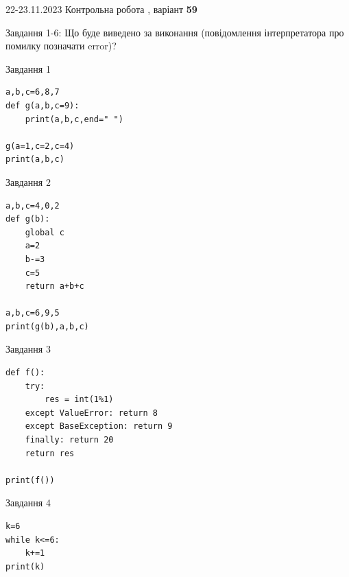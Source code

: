 \documentclass[12pt, ukrainian]{article}
\begin{document}
{{22-23.11.2023 Контрольна робота , варіант  \No \textbf { 59 }\par}}
{

Завдання 1-6: Що буде виведено за виконання (повідомлення інтерпретатора про помилку позначати error)?


\begin{minipage}[t]{9.7cm}                
{\begin{center}Завдання {1}\end{center}}
\begin{verbatim}
a,b,c=6,8,7
def g(a,b,c=9):
    print(a,b,c,end=" ")

g(a=1,c=2,c=4)
print(a,b,c)
\end{verbatim}     
\end{minipage}
\vline \hspace{8mm}
\begin{minipage}[t]{8.0cm}                
{\begin{center}Завдання {2}\end{center}}
\begin{verbatim}
a,b,c=4,0,2
def g(b):
    global c
    a=2
    b-=3
    c=5
    return a+b+c

a,b,c=6,9,5
print(g(b),a,b,c)
\end{verbatim}     
\end{minipage}

\vspace{15mm}
\begin{minipage}[t]{9.7cm}                
{\begin{center}Завдання {3}\end{center}}
\begin{verbatim}
def f():
    try:
        res = int(1%1)
    except ValueError: return 8
    except BaseException: return 9
    finally: return 20
    return res

print(f())
\end{verbatim}     
\end{minipage}
\vline \hspace{8mm}
\begin{minipage}[t]{8.0cm}                
{\begin{center}Завдання {4}\end{center}}
\begin{verbatim}
k=6
while k<=6:
    k+=1
print(k)
\end{verbatim}     
\end{minipage}

}
\end{document}

